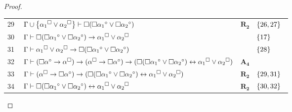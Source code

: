 \begin{tcolorbox}[enhanced jigsaw, breakable, sharp corners, colframe=black, colback=white, boxrule=0.5pt, left=1.5mm, right=1.5mm, top=1.5mm, bottom=1.5mm]
\begin{theorem}
\begin{proof}
\begin{xltabular}{\textwidth}{r | X l l}
            \scriptsize{29}\phantom{ } & $\ \Gamma \cup \left\{{\alpha_1}^\Box \vee {\alpha_2}^\Box\right\} \vdash \Box(\Box{\alpha_1}^\circ \vee \Box{\alpha_2}^\circ)$ & $\hyperref[modal.rule.2]{\mathbf{R_2}}$ & $\left\{26,27\right\}$\\[\rowskip]
            \scriptsize{30}\phantom{ } & $\ \Gamma \vdash \Box(\Box{\alpha_1}^\circ \vee \Box{\alpha_2}^\circ) \to {\alpha_1}^\Box \vee {\alpha_2}^\Box$ &  & $\left\{17\right\}$\\[\rowskip]
            \scriptsize{31}\phantom{ } & $\ \Gamma \vdash {\alpha_1}^\Box \vee {\alpha_2}^\Box \to \Box(\Box{\alpha_1}^\circ \vee \Box{\alpha_2}^\circ)$ &  & $\left\{28\right\}$\\[\rowskip]
            \scriptsize{32}\phantom{ } & $\ \Gamma \vdash (\Box\alpha^\circ \to \alpha^\Box) \to (\alpha^\Box \to \Box\alpha^\circ) \to (\Box(\Box{\alpha_1}^\circ \vee \Box{\alpha_2}^\circ) \leftrightarrow {\alpha_1}^\Box \vee {\alpha_2}^\Box)$ & $\hyperref[modal.axiom.4]{\mathbf{A_4}}$ & \\[\rowskip]
            \scriptsize{33}\phantom{ } & $\ \Gamma \vdash (\alpha^\Box \to \Box\alpha^\circ) \to (\Box(\Box{\alpha_1}^\circ \vee \Box{\alpha_2}^\circ) \leftrightarrow {\alpha_1}^\Box \vee {\alpha_2}^\Box)$ & $\hyperref[modal.rule.2]{\mathbf{R_2}}$ & $\left\{29,31\right\}$\\[\rowskip]
            \scriptsize{34}\phantom{ } & $\ \Gamma \vdash \Box(\Box{\alpha_1}^\circ \vee \Box{\alpha_2}^\circ) \leftrightarrow {\alpha_1}^\Box \vee {\alpha_2}^\Box$ & $\hyperref[modal.rule.2]{\mathbf{R_2}}$ & $\left\{30,32\right\}$\
        \end{xltabular}
        \normalsize



\end{proof}
\end{theorem}
\end{tcolorbox}
